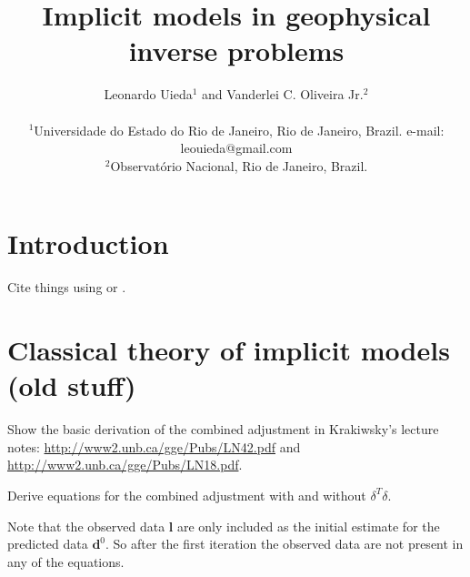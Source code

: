 \documentclass[twocolumn]{article}
\begin{document}
\title{
    Implicit models in geophysical inverse problems
}
\author{
    Leonardo Uieda$^{1}$
    and
    Vanderlei C. Oliveira Jr.$^{2}$
    \\\\
    {\small
        $^1$Universidade do Estado do Rio de Janeiro, Rio de Janeiro, Brazil.
        e-mail: leouieda@gmail.com
    }
    \\
    {\small
        $^2$Observatório Nacional, Rio de Janeiro, Brazil.
    }
}


\maketitle


\begin{abstract}
    \lipsum[1]
\end{abstract}


\section{Introduction}

Cite things using \citet{tikhonov1977} or \citep{tikhonov1977}.



\section{Classical theory of implicit models (old stuff)}

Show the basic derivation of the combined adjustment in Krakiwsky's lecture
notes:
\url{http://www2.unb.ca/gge/Pubs/LN42.pdf} and
\url{http://www2.unb.ca/gge/Pubs/LN18.pdf}.

Derive equations for the combined adjustment with and without $\delta^T\delta$.

Note that the observed data $\mathbf{l}$
are only included
as the initial estimate
for the predicted data $\mathbf{d}^0$.
So after the first iteration
the observed data are not present
in any of the equations.



\end{document}
